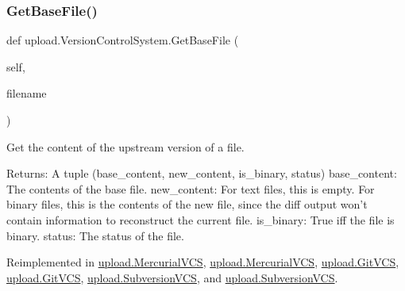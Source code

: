 \mbox{\label{classupload_1_1VersionControlSystem_adfd9d4ecba422102233a2ba13e5bfaf5}} 
\subsubsection{\texorpdfstring{GetBaseFile()}{GetBaseFile()}\hspace{0.1cm}{\footnotesize\ttfamily [1/2]}}
{\footnotesize\ttfamily def upload.\+Version\+Control\+System.\+Get\+Base\+File (\begin{DoxyParamCaption}\item[{}]{self,  }\item[{}]{filename }\end{DoxyParamCaption})}

\begin{DoxyVerb}Get the content of the upstream version of a file.

Returns:
  A tuple (base_content, new_content, is_binary, status)
base_content: The contents of the base file.
new_content: For text files, this is empty.  For binary files, this is
  the contents of the new file, since the diff output won't contain
  information to reconstruct the current file.
is_binary: True iff the file is binary.
status: The status of the file.
\end{DoxyVerb}
 

Reimplemented in \mbox{\hyperlink{classupload_1_1MercurialVCS_a0cdc0cbe6ac4daab82f5f01e6ae2e670}{upload.\+Mercurial\+V\+CS}}, \mbox{\hyperlink{classupload_1_1MercurialVCS_a0cdc0cbe6ac4daab82f5f01e6ae2e670}{upload.\+Mercurial\+V\+CS}}, \mbox{\hyperlink{classupload_1_1GitVCS_a70ddb65a6b512b8cb8cc4affa37ff9b4}{upload.\+Git\+V\+CS}}, \mbox{\hyperlink{classupload_1_1GitVCS_a70ddb65a6b512b8cb8cc4affa37ff9b4}{upload.\+Git\+V\+CS}}, \mbox{\hyperlink{classupload_1_1SubversionVCS_a29dec4941de0824734d6842a2f33ffc3}{upload.\+Subversion\+V\+CS}}, and \mbox{\hyperlink{classupload_1_1SubversionVCS_a29dec4941de0824734d6842a2f33ffc3}{upload.\+Subversion\+V\+CS}}.

\mbox{\label{classupload_1_1VersionControlSystem_adfd9d4ecba422102233a2ba13e5bfaf5}} 
